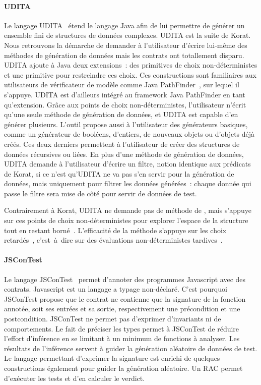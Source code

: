 \paragraph{UDITA} Le langage UDITA~ étend le langage Java
afin de lui permettre de générer un ensemble fini de structures de données
complexes. UDITA est la suite de Korat. Nous retrouvons la démarche de demander
à l'utilisateur d'écrire lui-même des méthodes de génération de données mais les
contrats ont totallement disparu. UDITA ajoute à Java deux extensions~: des
primitives de choix non-déterministes et une primitive pour restreindre ces
choix. Ces constructions sont familiaires aux utilisateurs de vérificateur de
modèle comme Java PathFinder~, sur lequel il s'appuye. UDITA
est d'ailleurs intégré au framework Java PathFinder en tant qu'extension. Grâce
aux points de choix non-déterministes, l'utilisateur n'écrit qu'une seule
méthode de génération de données, et UDITA est capable d'en générer plusieurs.
L'outil propose aussi à l'utilisateur des générateurs basiques, comme un
générateur de booléens, d'entiers, de nouveaux objets ou d'objets déjà créés.
Ces deux derniers permettent à l'utilisateur de créer des structures de données
récursives ou liées. En plus d'une méthode de génération de données, UDITA
demande à l'utilisateur d'écrire un filtre, notion identique aux prédicats de
Korat, si ce n'est qu'UDITA ne va pas s'en servir pour la génération de données,
mais uniquement pour filtrer les données générées~: chaque donnée qui passe le
filtre sera mise de côté pour servir de données de test.

Contrairement à Korat, UDITA ne demande pas de méthode de
, mais s'appuye sur ces points de choix
non-déterministes pour explorer l'espace de la structure tout en restant
borné~. L'efficacité de la méthode s'appuye
sur les choix retardés~, c'est~à~dire sur des évaluations
non-déterministes tardives~.

\paragraph{JSConTest} Le langage JSConTest~ permet d'annoter
des programmes Javascript avec des contrats. Javascript est un langage a typage
non-déclaré.  C'est pourquoi JSConTest propose que le contrat ne contienne que
la signature de la fonction annotée, soit ses entrées et sa sortie,
respectivement une précondition et une postcondition. JSConTest ne permet pas
d'exprimer d'invariants ni de comportements. Le fait de préciser les types
permet à JSConTest de réduire l'effort d'inférence en se limitant à un minimum
de fonctions à analyser. Les résultats de l'inférence servent à guider la
génération aléatoire de données de test. Le langage permettant d'exprimer la
signature est enrichi de quelques constructions également pour guider la
génération aléatoire. Un RAC permet d'exécuter les tests et d'en calculer le
verdict.

